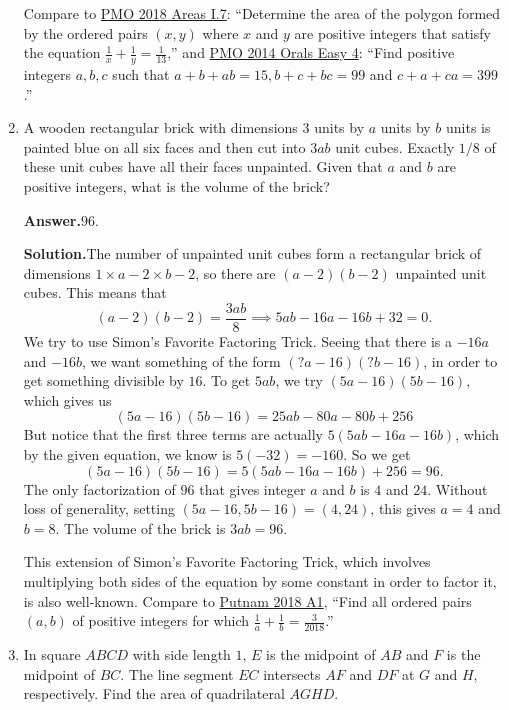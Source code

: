 \documentclass[11pt,paper=letter]{scrartcl}
\newcommand{\ans}{{\sffamily \bfseries Answer.}\;}
\newcommand{\sol}{{\sffamily \bfseries Solution.}\;}
\newcommand{\rem}[1]{{\small \sffamily \sansmath {\bfseries Remark.} #1}}
\begin{document}
\begin{enumerate}[left=0pt]
\rem{Compare to \href{https://cjquines.com/files/pmo2018areas.pdf}{PMO 2018 Areas I.7{}}: ``Determine the area of the polygon formed by the ordered pairs $(x, y)$ where $x$ and $y$ are positive integers that satisfy the equation $\frac1x + \frac1y = \frac1{13}$,'' and \href{http://pmo.ph/wp-content/uploads/2014/08/18th-PMO-National-Stage-Oral-Phase-Q-and-A.pdf}{PMO 2014 Orals Easy 4}: ``Find positive integers $a, b, c$ such that $a + b + ab = 15, b + c + bc = 99$ and $c + a + ca = 399$.''}

\item A wooden rectangular brick with dimensions $3$ units by $a$ units by $b$ units is painted blue on all six faces and then cut into $3ab$ unit cubes. Exactly $1/8$ of these unit cubes have all their faces unpainted. Given that $a$ and $b$ are positive integers, what is the volume of the brick?

\ans $\boxed{96}$.

\sol The number of unpainted unit cubes form a rectangular brick of dimensions $1 \times a - 2 \times b - 2$, so there are $(a-2)(b-2)$ unpainted unit cubes. This means that
\[
  (a-2)(b-2) = \frac{3ab}{8} \implies 5ab - 16a - 16b + 32 = 0.
\]
We try to use Simon's Favorite Factoring Trick. Seeing that there is a $-16a$ and $-16b$, we want something of the form $(?a - 16)(?b - 16)$, in order to get something divisible by $16$. To get $5ab$, we try $(5a - 16)(5b - 16)$, which gives us
\[
  (5a - 16)(5b - 16) = 25ab - 80a - 80b + 256
\]
But notice that the first three terms are actually $5(5ab - 16a - 16b)$, which by the given equation, we know is $5(-32) = -160$. So we get
\[
  (5a - 16)(5b - 16) = 5(5ab - 16a - 16b) + 256 = 96.
\]
The only factorization of $96$ that gives integer $a$ and $b$ is $4$ and $24$. Without loss of generality, setting $(5a - 16, 5b - 16) = (4, 24)$, this gives $a = 4$ and $b = 8$. The volume of the brick is $3ab = 96$.

\rem{This extension of Simon's Favorite Factoring Trick, which involves multiplying both sides of the equation by some constant in order to factor it, is also well-known. Compare to \href{https://kskedlaya.org/putnam-archive/2018.pdf}{Putnam 2018 A1{}}, ``Find all ordered pairs $(a, b)$ of positive integers for which $\frac{1}{a} + \frac{1}{b} = \frac{3}{2018}$.'' }

\item In square $ABCD$ with side length $1$, $E$ is the midpoint of $AB$ and $F$ is the midpoint of $BC$. The line segment $EC$ intersects $AF$ and $DF$ at $G$ and $H$, respectively. Find the area of quadrilateral $AGHD$.


\end{enumerate}
\end{document}
